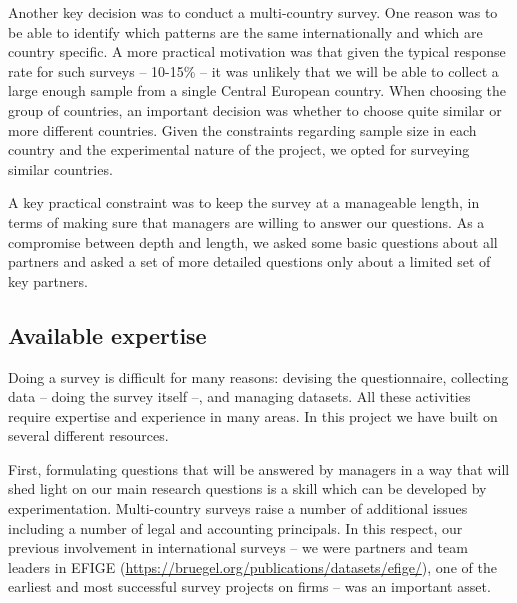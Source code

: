 \documentclass[final, dvipsnames, authoryear,12pt]{elsarticle}
\begin{document}
Another key decision was to conduct a multi-country survey. One reason was to be able to identify which patterns are the same internationally and which are country specific. A more practical motivation was that given the typical response rate for such surveys -- 10-15\% -- it was unlikely that we will be able to collect a large enough sample from a single Central European country. When choosing the group of countries, an important decision was whether to choose quite similar or more different countries. Given the constraints regarding sample size in each country and the experimental nature of the project, we opted for surveying similar countries.

A key practical constraint was to keep the survey at a manageable length, in terms of making sure that managers are willing to answer our questions. As a compromise between depth and length, we asked some basic questions about all partners and asked a set of more detailed questions only about a limited set of key partners. 



\subsection{Available expertise}

Doing a survey is difficult for many reasons: devising the questionnaire, collecting data -- doing the survey itself --, and managing datasets. All these activities require expertise and experience in many areas. In this project we have built on several different resources.

First, formulating questions that will be answered by managers in a way that will shed light on our main research questions is a skill which can be developed by experimentation. Multi-country surveys raise a number of additional issues including a number of legal and accounting principals. In this respect, our previous involvement in international surveys -- we were partners and team leaders in EFIGE (\url{https://bruegel.org/publications/datasets/efige/}), one of the earliest and most successful survey projects on firms -- was an important asset. 
\end{document}
